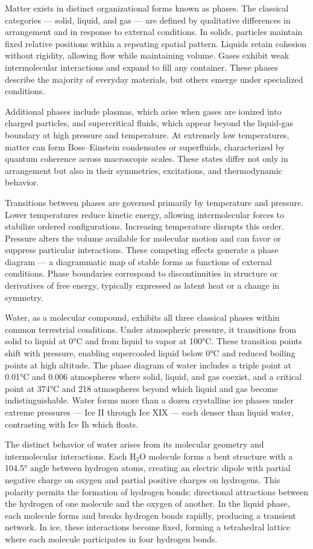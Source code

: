 Matter exists in distinct organizational forms known as phases. The classical categories — solid, liquid, and gas — are defined by qualitative differences in arrangement and in response to external conditions. In solids, particles maintain fixed relative positions within a repeating spatial pattern. Liquids retain cohesion without rigidity, allowing flow while maintaining volume. Gases exhibit weak intermolecular interactions and expand to fill any container. These phases describe the majority of everyday materials, but others emerge under specialized conditions.

Additional phases include plasmas, which arise when gases are ionized into charged particles, and supercritical fluids, which appear beyond the liquid-gas boundary at high pressure and temperature. At extremely low temperatures, matter can form Bose–Einstein condensates or superfluids, characterized by quantum coherence across macroscopic scales. These states differ not only in arrangement but also in their symmetries, excitations, and thermodynamic behavior.

Transitions between phases are governed primarily by temperature and pressure. Lower temperatures reduce kinetic energy, allowing intermolecular forces to stabilize ordered configurations. Increasing temperature disrupts this order. Pressure alters the volume available for molecular motion and can favor or suppress particular interactions. These competing effects generate a phase diagram — a diagrammatic map of stable forms as functions of external conditions. Phase boundaries correspond to discontinuities in structure or derivatives of free energy, typically expressed as latent heat or a change in symmetry.

Water, as a molecular compound, exhibits all three classical phases within common terrestrial conditions. Under atmospheric pressure, it transitions from solid to liquid at 0°C and from liquid to vapor at 100°C. These transition points shift with pressure, enabling supercooled liquid below 0°C and reduced boiling points at high altitude. The phase diagram of water includes a triple point at 0.01°C and 0.006 atmospheres where solid, liquid, and gas coexist, and a critical point at 374°C and 218 atmospheres beyond which liquid and gas become indistinguishable. Water forms more than a dozen crystalline ice phases under extreme pressures — Ice II through Ice XIX — each denser than liquid water, contrasting with Ice Ih which floats.

The distinct behavior of water arises from its molecular geometry and intermolecular interactions. Each H\(_2\)O molecule forms a bent structure with a 104.5° angle between hydrogen atoms, creating an electric dipole with partial negative charge on oxygen and partial positive charges on hydrogens. This polarity permits the formation of hydrogen bonds: directional attractions between the hydrogen of one molecule and the oxygen of another. In the liquid phase, each molecule forms and breaks hydrogen bonds rapidly, producing a transient network. In ice, these interactions become fixed, forming a tetrahedral lattice where each molecule participates in four hydrogen bonds.

